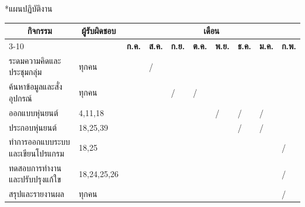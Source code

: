 \documentclass[14pt, fleqn, a4paper]{extarticle}
\makeatletter
\renewcommand\section{%
  \@ifstar{\flatsection}{\@section}%
}
\newcommand{\flatsection}[1]{%
   \par\medskip\noindent
   {\bfseries #1\par}
}
\makeatother
\begin{document}
\section*{แผนปฏิบัติงาน}
\begin{table}[]
\begin{tabular}{|l|l|llllllll|}
\hline
\multicolumn{1}{|c|}{\multirow{2}{*}{\textbf{กิจกรรม}}} & \multicolumn{1}{c|}{\multirow{2}{*}{\textbf{ผู้รับผิดชอบ}}} & \multicolumn{8}{c|}{\textbf{เดือน}} \\ \cline{3-10} 
\multicolumn{1}{|c|}{} & \multicolumn{1}{c|}{} & \multicolumn{1}{c|}{\textbf{ก.ค.}} & \multicolumn{1}{c|}{\textbf{ส.ค.}} & \multicolumn{1}{c|}{\textbf{ก.ย.}} & \multicolumn{1}{c|}{\textbf{ต.ค.}} & \multicolumn{1}{c|}{\textbf{พ.ย.}} & \multicolumn{1}{c|}{\textbf{ธ.ค.}} & \multicolumn{1}{c|}{\textbf{ม.ค.}} & \multicolumn{1}{c|}{\textbf{ก.พ.}} \\ \hline
ระดมความคิดและประชุมกลุ่ม & ทุกคน & \multicolumn{1}{l|}{} & \multicolumn{1}{l|}{/} & \multicolumn{1}{l|}{} & \multicolumn{1}{l|}{} & \multicolumn{1}{l|}{} & \multicolumn{1}{l|}{} & \multicolumn{1}{l|}{} &  \\ \hline
ค้นหาข้อมูลและสั่งอุปกรณ์ & ทุกคน & \multicolumn{1}{l|}{} & \multicolumn{1}{l|}{} & \multicolumn{1}{l|}{/} & \multicolumn{1}{l|}{/} & \multicolumn{1}{l|}{} & \multicolumn{1}{l|}{} & \multicolumn{1}{l|}{} &  \\ \hline
ออกแบบหุ่นยนต์ & 4,11,18 & \multicolumn{1}{l|}{} & \multicolumn{1}{l|}{} & \multicolumn{1}{l|}{} & \multicolumn{1}{l|}{} & \multicolumn{1}{l|}{/} & \multicolumn{1}{l|}{/} & \multicolumn{1}{l|}{/} &  \\ \hline
ประกอบหุ่นยนต์ & 18,25,39 & \multicolumn{1}{l|}{} & \multicolumn{1}{l|}{} & \multicolumn{1}{l|}{} & \multicolumn{1}{l|}{} & \multicolumn{1}{l|}{} & \multicolumn{1}{l|}{/} & \multicolumn{1}{l|}{/} &  \\ \hline
ทำการออกแบบระบบและเขียนโปรแกรม & 18,25 & \multicolumn{1}{l|}{} & \multicolumn{1}{l|}{} & \multicolumn{1}{l|}{} & \multicolumn{1}{l|}{} & \multicolumn{1}{l|}{} & \multicolumn{1}{l|}{} & \multicolumn{1}{l|}{} & / \\ \hline
ทดสอบการทำงานและปรับปรุงแก้ใข & 18,24,25,26 & \multicolumn{1}{l|}{} & \multicolumn{1}{l|}{} & \multicolumn{1}{l|}{} & \multicolumn{1}{l|}{} & \multicolumn{1}{l|}{} & \multicolumn{1}{l|}{} & \multicolumn{1}{l|}{} & / \\ \hline
สรุปและรายงานผล & ทุกคน & \multicolumn{1}{l|}{} & \multicolumn{1}{l|}{} & \multicolumn{1}{l|}{} & \multicolumn{1}{l|}{} & \multicolumn{1}{l|}{} & \multicolumn{1}{l|}{} & \multicolumn{1}{l|}{} & / \\ \hline
\end{tabular}
\end{table}
\end{document}

